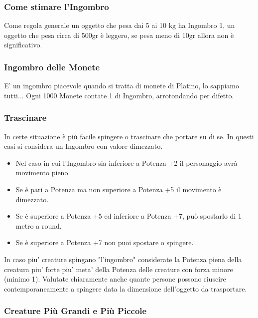 \documentclass[a4paper,11pt,twoside,openany]{book}
\begin{document}
\subsubsection{Come stimare l'Ingombro}

Come regola generale un oggetto che pesa dai 5 ai 10 kg ha Ingombro 1, un oggetto che pesa circa di 500gr è leggero, se pesa meno di 10gr allora non è significativo.

\subsubsection{Ingombro delle Monete}

E' un ingombro piacevole quando si tratta di monete di Platino, lo sappiamo tutti...
Ogni 1000 Monete contate 1 di Ingombro, arrotondando per difetto.


\subsubsection{Trascinare}

In certe situazione è più facile spingere o trascinare che portare su di se.
In questi casi si considera un Ingombro con valore dimezzato.

\begin{itemize}
	\item Nel caso in cui l'Ingombro sia inferiore a Potenza +2 il personaggio avrà movimento pieno.

	\item Se è pari a Potenza ma non superiore a Potenza +5 il movimento è dimezzato.

	\item Se è superiore a Potenza +5 ed inferiore a Potenza +7, può spostarlo di 1 metro a round.

	\item Se è superiore a Potenza +7 non puoi spostare o spingere.
\end{itemize}

In caso piu' creature spingano "l'ingombro" considerate la Potenza piena della creatura piu' forte piu' meta' della Potenza delle creature con forza minore (minimo 1). Valutate chiaramente anche quante persone possono riuscire contemporaneamente a spingere data la dimensione dell'oggetto da trasportare.

\subsubsection{Creature Più Grandi e Più Piccole}
\end{document}
